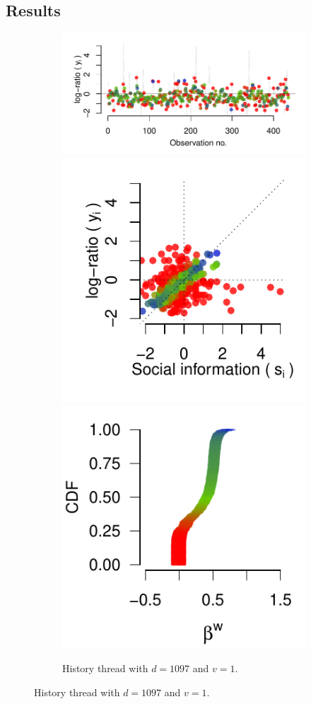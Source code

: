 \documentclass[9pt,a4paper,twocolumn,lineno]{article}
\begin{document}
\subsection*{Results}
\begin{figure}[h]
	\centering
	\begin{subfigure}{.44\linewidth}
		\centering
		
		\includegraphics[width=1\linewidth]{threads/thread_history_1097_1.pdf}
		\includegraphics[width=.48\linewidth]{info/info_history_1097_1.pdf}
		\includegraphics[width=.48\linewidth]{betas/beta_history_1097_1.pdf}
		\caption{\footnotesize History thread with $d=1097$ and $v=1$.}
		\label{fig: h=history d=1097, v=1}

\end{subfigure}
\end{figure}
\end{document}
